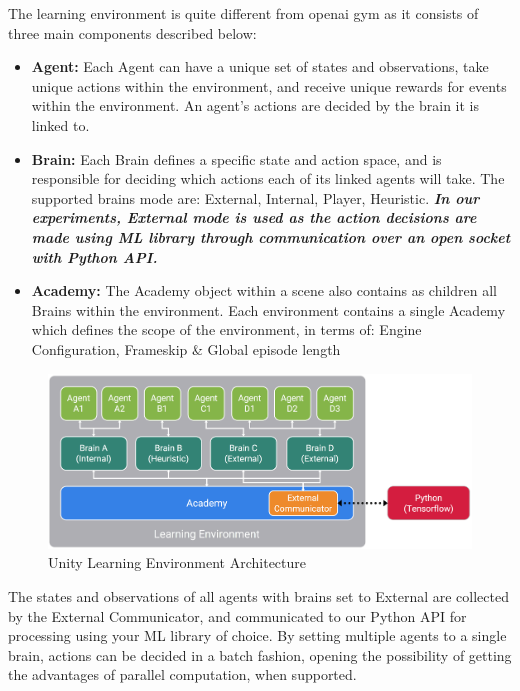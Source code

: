 The learning environment is quite different from openai gym as it consists of three main components described below:

\begin{itemize}
	\item \textbf{Agent:} Each Agent can have a unique set of states and observations, take unique actions within the environment, and receive unique rewards for events within the environment. An agent’s actions are decided by the brain it is linked to.
	\item \textbf{Brain:} Each Brain defines a specific state and action space, and is responsible for deciding which actions each of its linked agents will take. The supported brains mode are: External, Internal, Player, Heuristic. \textit{\textbf{In our experiments, External mode is used as the action decisions are made using ML library through communication over an open socket with Python API.}}
	\item \textbf{Academy:} The Academy object within a scene also contains as children all Brains within the environment. Each environment contains a single Academy which defines the scope of the environment, in terms of: Engine Configuration, Frameskip \& Global episode length
\end{itemize}

\begin{figure}[!htb]
	\centering
		\includegraphics[width=\linewidth]{figures/unity_api.png}
		\caption{Unity Learning Environment Architecture}
		\label{fig:unity_api}
\end{figure}

The states and observations of all agents with brains set to External are collected by the External Communicator, and communicated to our Python API for processing using your ML library of choice. By setting multiple agents to a single brain, actions can be decided in a batch fashion, opening the possibility of getting the advantages of parallel computation, when supported.

